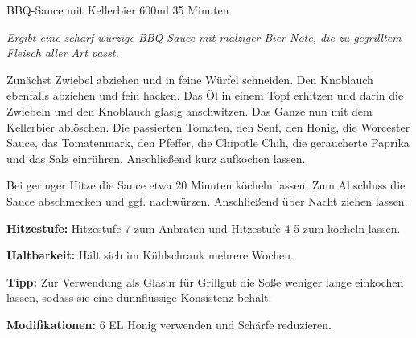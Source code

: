 \documentclass[
  DIV=11,%
  pagesize,%
  fontsize=11pt,%
  paper=a4,%
]{scrartcl}
\begin{document}
\begin{recipe}{BBQ-Sauce mit Kellerbier} {600ml} {35 Minuten}

\freeform
\textit{Ergibt eine scharf würzige BBQ-Sauce mit malziger Bier Note, die zu gegrilltem Fleisch aller Art passt.}


Zunächst Zwiebel abziehen und in feine Würfel schneiden.
Den Knoblauch ebenfalls abziehen und fein hacken.
Das Öl in einem Topf erhitzen und darin die Zwiebeln und den Knoblauch glasig anschwitzen.
Das Ganze nun mit dem Kellerbier ablöschen.
Die passierten Tomaten, den Senf, den Honig, die Worcester Sauce, das Tomatenmark, den Pfeffer, die Chipotle Chili, die geräucherte Paprika und das Salz einrühren.
Anschließend kurz aufkochen lassen.

\newstep
Bei geringer Hitze die Sauce etwa 20 Minuten köcheln lassen.
Zum Abschluss die Sauce abschmecken und ggf. nachwürzen.
Anschließend über Nacht ziehen lassen.

\freeform
\hrulefill

\freeform 
\textbf{Hitzestufe:}
Hitzestufe 7 zum Anbraten und Hitzestufe 4-5 zum köcheln lassen.

\freeform 
\textbf{Haltbarkeit:}
Hält sich im Kühlschrank mehrere Wochen.

\freeform 
\textbf{Tipp:}
Zur Verwendung als Glasur für Grillgut die Soße weniger lange einkochen lassen, sodass sie eine dünnflüssige Konsistenz behält.

\freeform 
\textbf{Modifikationen:}
6 EL Honig verwenden und Schärfe reduzieren.

\end{recipe}
\end{document}
